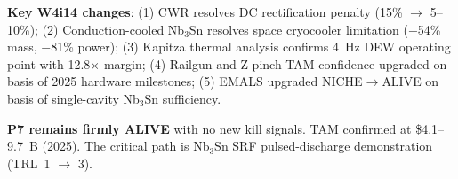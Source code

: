\documentclass[11pt]{article}
\begin{document}
\textbf{Key W4i14 changes}: (1) CWR resolves DC rectification
penalty (15\% $\to$ 5--10\%); (2) Conduction-cooled Nb$_3$Sn
resolves space cryocooler limitation ($-$54\% mass, $-$81\% power);
(3) Kapitza thermal analysis confirms 4~Hz DEW operating point
with 12.8$\times$ margin; (4) Railgun and Z-pinch TAM confidence
upgraded on basis of 2025 hardware milestones; (5) EMALS upgraded
NICHE$\to$ALIVE on basis of single-cavity Nb$_3$Sn sufficiency.

\textbf{P7 remains firmly ALIVE} with no new kill signals. TAM
confirmed at \$4.1--9.7~B (2025). The critical path is Nb$_3$Sn
SRF pulsed-discharge demonstration (TRL~1 $\to$ 3).
\end{document}
